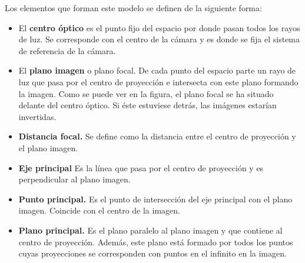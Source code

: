 Los elementos que forman este modelo se definen de la siguiente forma:
\begin{itemize}
\item El \textbf{centro óptico} es el punto fijo del espacio por donde pasan todos los rayos de luz. Se corresponde con el centro de la cámara y es donde se fija el sistema de referencia de la cámara.
\item El \textbf{plano imagen} o plano focal. De cada punto del espacio parte un rayo de luz que pasa por el centro de proyección e intersecta con este plano formando la imagen. Como se puede ver en la figura, el plano focal se ha situado delante del centro óptico. Si éste estuviese detrás, las imágenes estarían invertidas.
\item \textbf{Distancia focal.} Se define como la distancia entre el centro de proyección y el plano imagen.
\item \textbf{Eje principal} Es la línea que pasa por el centro de proyección y es perpendicular al plano imagen.
\item \textbf{Punto principal.} Es el punto de intersección del eje principal con el plano imagen. Coincide con el centro de la imagen.
\item \textbf{Plano principal.} Es el plano paralelo al plano imagen y que contiene al centro de proyección. Además, este plano está formado por todos los puntos cuyas proyecciones se corresponden con puntos en el infinito en la imagen.
\end{itemize}




